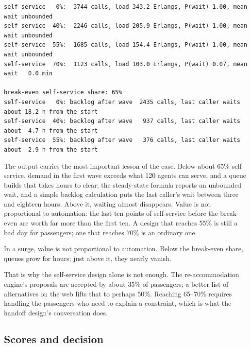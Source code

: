 

\begin{lstlisting}[language={}, numbers=none, frame=none, xleftmargin=0em, basicstyle=\ttfamily\scriptsize]
self-service   0%:  3744 calls, load 343.2 Erlangs, P(wait) 1.00, mean wait unbounded
self-service  40%:  2246 calls, load 205.9 Erlangs, P(wait) 1.00, mean wait unbounded
self-service  55%:  1685 calls, load 154.4 Erlangs, P(wait) 1.00, mean wait unbounded
self-service  70%:  1123 calls, load 103.0 Erlangs, P(wait) 0.07, mean wait   0.0 min

break-even self-service share: 65%
self-service   0%: backlog after wave  2435 calls, last caller waits about 18.2 h from the start
self-service  40%: backlog after wave   937 calls, last caller waits about  4.7 h from the start
self-service  55%: backlog after wave   376 calls, last caller waits about  2.9 h from the start
\end{lstlisting}

The output carries the most important lesson of the case. Below about 65\% self-service, demand in the first wave exceeds what 120 agents can serve, and a queue builds that takes hours to clear; the steady-state formula reports an unbounded wait, and a simple backlog calculation puts the last caller's wait between three and eighteen hours. Above it, waiting almost disappears. Value is not proportional to automation: the last ten points of self-service before the break-even are worth far more than the first ten. A design that reaches 55\% is still a bad day for passengers; one that reaches 70\% is an ordinary one.

\begin{keyidea}
In a surge, value is not proportional to automation. Below the break-even share, queues grow for hours; just above it, they nearly vanish.
\end{keyidea}

That is why the self-service design alone is not enough. The re-accommodation engine's proposals are accepted by about 35\% of passengers; a better list of alternatives on the web lifts that to perhaps 50\%. Reaching 65--70\% requires handling the passengers who need to explain a constraint, which is what the handoff design's conversation does.

\subsection{Scores and decision}

